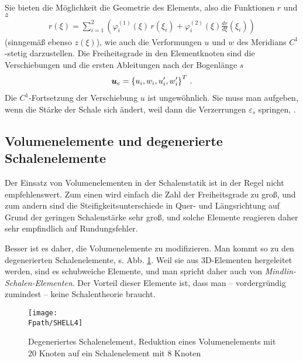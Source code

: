 Sie bieten die M\"{o}glichkeit die Geometrie des Elements, also die Funktionen $r$ und $z$
\begin{align}
r(\xi) = \sum_{i = 1}^2 (\varphi^{(1)}_i(\xi)\,r(\xi_i) + \varphi^{(2)}_i(\xi) \frac{d
r}{d \xi}(\xi_i))
\end{align}
(sinngem\"{a}{\ss} ebenso $z(\xi)$), wie auch die Verformungen $u$ und $w$ des Meridians $C^1$-stetig darzustellen. Die Freiheitsgrade in den Elementknoten sind die Verschiebungen und die ersten Ableitungen nach der Bogenl\"{a}nge $s$
\begin{align}
\mbox{\boldmath $u$}_e = \left\{u_i,w_i,u'_i,w'_i \right\}^T\,.
\end{align}
Die $C^1$-Fortsetzung der Verschiebung $u$ ist ungew\"{o}hnlich. Sie muss man aufgeben, wenn
die St\"{a}rke der Schale sich \"{a}ndert, weil dann die Verzerrungen $\varepsilon_s$ springen,
\cite{Z1}.

{\textcolor{sectionTitleBlue}{\section{Volumenelemente und degenerierte Schalenelemente}}}\label{AllgemeineSchalenelemente}
Der Einsatz von Volumenelementen in der Schalenstatik ist in der Regel nicht empfehlenswert. Zum einen wird einfach die Zahl der Freiheitsgrade zu gro{\ss}, und zum andern sind die Steifigkeitsunterschiede in Quer- und L\"{a}ngsrichtung auf Grund der geringen Schalenst\"{a}rke sehr gro{\ss}, und solche Elemente reagieren daher sehr empfindlich auf Rundungsfehler.

Besser ist es daher, die Volumenelemente zu modifizieren. Man kommt so zu den degenerierten Schalenelemente, s. Abb. \ref{Shell4}. Weil sie aus 3D-Elementen hergeleitet werden, sind es schubweiche Elemente, und man spricht daher auch von {\em Mindlin-Schalen-Elementen\/}. Der Vorteil dieser Elemente ist, dass man -- vordergr\"{u}ndig zumindest -- keine Schalentheorie braucht.
\begin{figure}[h]
\if {} \sidecaption \fi
\texttt{[image: \\Fpath/SHELL4]}
\caption{Degeneriertes Schalenelement, Reduktion eines Volumenelements mit 20 Knoten auf
ein Schalenelement mit 8 Knoten} \label{Shell4}
\end{figure}

